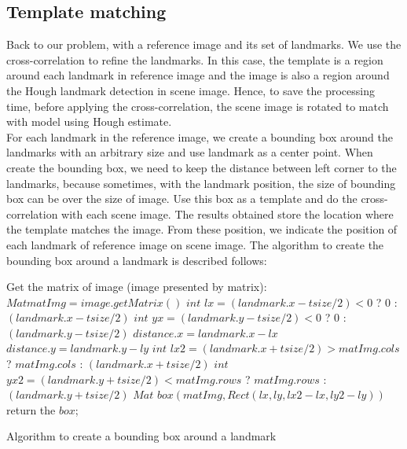 \subsection{Template matching}
Back to our problem, with a reference image and its set of landmarks. We use the cross-correlation to refine the landmarks. In this case, the template is a region around each landmark in reference image and the image is also a region around the Hough landmark detection in scene image. Hence, to save the processing time, before applying the cross-correlation, the scene image is rotated to match with model using Hough estimate.\\[0.2cm]
For each landmark in the reference image, we create a bounding box around the landmarks with an arbitrary size and use landmark as a center point. When create the bounding box, we need to keep the distance between left corner to the landmarks, because sometimes, with the landmark position, the size of bounding box can be over the size of image. Use this box as a template and do the cross-correlation with each scene image. The results obtained store the location where the template matches the image. From these position, we indicate the position of each landmark of reference image on scene image. The algorithm to create the bounding box around a landmark is described follows:\\[0.2cm]
\begin{algorithm}[H]
\Indm 
\SetAlgoLined
{}
\Indp
Get the matrix of image (image presented by matrix): $Mat matImg = image.getMatrix()$\;
$int$ $lx = (landmark.x - tsize/2) < 0$ ? $0$ : $(landmark.x - tsize/2)$\;
$int$ $yx = (landmark.y - tsize/2) < 0$ ? $0$ : $(landmark.y - tsize/2)$\;
$distance.x = landmark.x - lx$\;
$distance.y = landmark.y - ly$\;
$int$ $lx2 = (landmark.x + tsize/2) > matImg.cols$ ? $matImg.cols$ : $(landmark.x + tsize/2)$\;
$int$ $yx2 = (landmark.y + tsize/2) < matImg.rows$ ? $matImg.rows$ : $(landmark.y + tsize/2)$\;
$Mat$ $box(matImg,Rect(lx,ly,lx2 - lx, ly2 - ly))$\;
return the $box$;
\caption{Algorithm to create a bounding box around a landmark}
\end{algorithm}~\\[0.2cm]
